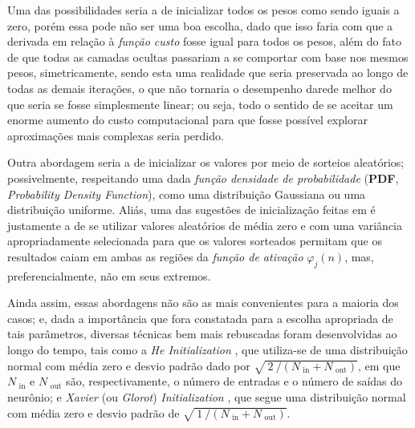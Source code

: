 Uma das possibilidades seria a de inicializar todos os pesos como sendo iguais a zero, porém essa pode não ser uma boa escolha, dado que isso faria com que a derivada em relação à \textit{função custo} fosse igual para todos os pesos, além do fato de que todas as camadas ocultas passariam a se comportar com base nos mesmos pesos, simetricamente, sendo esta uma realidade que seria preservada ao longo de todas as demais iterações, o que não tornaria o desempenho darede melhor do que seria se fosse simplesmente linear; ou seja, todo o sentido de se aceitar um enorme aumento do custo computacional para que fosse possível explorar aproximações mais complexas seria perdido.

Outra abordagem seria a de inicializar os valores por meio de sorteios aleatórios; possivelmente, respeitando uma dada \textit{função densidade de probabilidade} (\textbf{PDF}, \textit{Probability Density Function}), como uma distribuição Gaussiana ou uma distribuição uniforme. Aliás, uma das sugestões de inicialização feitas em \citep{haykin1999neural} é justamente a de se utilizar valores aleatórios de média zero e com uma variância apropriadamente selecionada para que os valores sorteados permitam que os resultados caiam em ambas as regiões da \textit{função de ativação} $\varphi_{j}(n)$, mas, preferencialmente, não em seus extremos.

Ainda assim, essas abordagens não são as mais convenientes para a maioria dos casos; e, dada a importância que fora constatada para a escolha apropriada de tais parâmetros, diversas técnicas bem mais rebuscadas foram desenvolvidas ao longo do tempo, tais como a \textit{He Initialization} \citep{he2015delving}, que utiliza-se de uma distribuição normal com média zero e desvio padrão dado por $\sqrt{\ 2\ / \left(N_{\text{\ in}} + N_{\text{\ out}}\right)}$, em que $N_{\text{\ in}}$ e $N_{\text{\ out}}$ são, respectivamente, o número de entradas e o número de saídas do neurônio; e \textit{Xavier} (ou \textit{Glorot}) \textit{Initialization} \citep{glorot2010understanding}, que segue uma distribuição normal com média zero e desvio padrão de $\sqrt{\ 1\ / \left(N_{\text{\ in}} + N_{\text{\ out}}\right)}$.